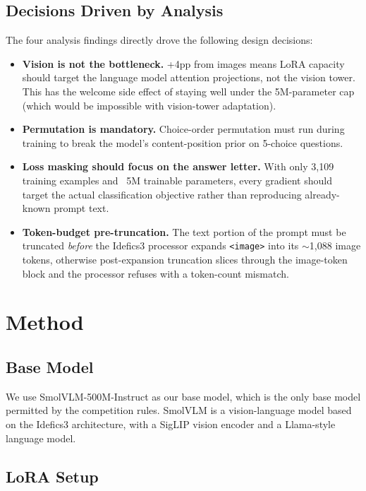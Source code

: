 \documentclass[11pt]{article}
\begin{document}
\subsection{Decisions Driven by Analysis}

The four analysis findings directly drove the following design decisions:
\begin{itemize}
    \item \textbf{Vision is not the bottleneck.} +4pp from images means LoRA capacity should target the language model attention projections, not the vision tower. This has the welcome side effect of staying well under the 5M-parameter cap (which would be impossible with vision-tower adaptation).
    \item \textbf{Permutation is mandatory.} Choice-order permutation must run during training to break the model's content-position prior on 5-choice questions.
    \item \textbf{Loss masking should focus on the answer letter.} With only 3,109 training examples and ~5M trainable parameters, every gradient should target the actual classification objective rather than reproducing already-known prompt text.
    \item \textbf{Token-budget pre-truncation.} The text portion of the prompt must be truncated \emph{before} the Idefics3 processor expands \texttt{<image>} into its $\sim$1{,}088 image tokens, otherwise post-expansion truncation slices through the image-token block and the processor refuses with a token-count mismatch.
\end{itemize}

\section{Method}

\subsection{Base Model}

We use SmolVLM-500M-Instruct as our base model, which is the only base model permitted by the competition rules. SmolVLM is a vision-language model based on the Idefics3 architecture, with a SigLIP vision encoder and a Llama-style language model.

\subsection{LoRA Setup}
\end{document}
